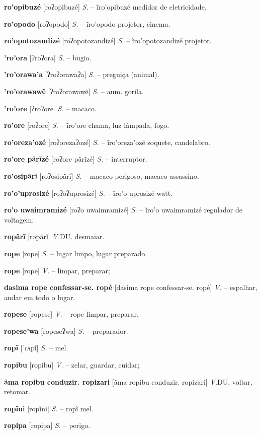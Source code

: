 \textbf{ro'opibuzé} [roʔopibuzé] \textit{S.} -- ĩro'opibuzé medidor de eletricidade.

\textbf{ro'opodo} [roʔopodo] \textit{S.} -- ĩro'opodo projetor, cinema.

\textbf{ro'opotozandizé} [roʔopotozandizé] \textit{S.} -- ĩro'opotozandizé projetor.

\textbf{'ro'ora} [ʔroʔora] \textit{S.} -- bugio.

\textbf{'ro'orawa'a} [ʔroʔorawaʔa] \textit{S.} -- preguiça (animal).

\textbf{'ro'orawawẽ} [ʔroʔorawawẽ] \textit{S.} -- aum. gorila.

\textbf{'ro'ore} [ʔroʔore] \textit{S.} -- macaco.

\textbf{ro'ore} [roʔore] \textit{S.} -- ĩro'ore chama, luz lâmpada, fogo.

\textbf{ro'oreza'ozé} [roʔorezaʔozé] \textit{S.} -- ĩro'oreza'ozé soquete, candelabro.

\textbf{ro'ore pãrĩzé} [roʔore pãrĩzé] \textit{S.} -- interruptor.

\textbf{ro'osipãrĩ} [roʔosipãrĩ] \textit{S.} -- macaco perigoso, macaco assassino.

\textbf{ro'o'uprosizé} [roʔoʔuprosizé] \textit{S.} -- ĩro'o uprosizé watt.

\textbf{ro'o uwaimramizé} [roʔo uwaimramizé] \textit{S.} -- ĩro'o uwaimramizé regulador de voltagem.

\textbf{ropãrĩ} [ropãrĩ] \textit{V.}DU. desmaiar.

\textbf{rope} [rope] \textit{S.} -- lugar limpo, lugar preparado.

\textbf{rope} [rope] \textit{V.} -- limpar, preparar;

\textbf{dasima rope confessar-se. ropé} [dasima rope confessar-se. ropé] \textit{V.} -- espalhar, andar em todo o lugar.

\textbf{ropese} [ropese] \textit{V.} -- rope limpar, preparar.

\textbf{ropese'wa} [ropeseʔwa] \textit{S.} -- preparador.

\textbf{ropĩ} [ˈɾʌpĩ] \textit{S.} -- mel.

\textbf{ropibu} [ropibu] \textit{V.} -- zelar, guardar, cuidar;

\textbf{ãma ropibu conduzir. ropizari} [ãma ropibu conduzir. ropizari] \textit{V.}DU. voltar, retomar.

\textbf{ropĩni} [ropĩni] \textit{S.} -- ropĩ mel.

\textbf{ropipa} [ropipa] \textit{S.} -- perigo.

